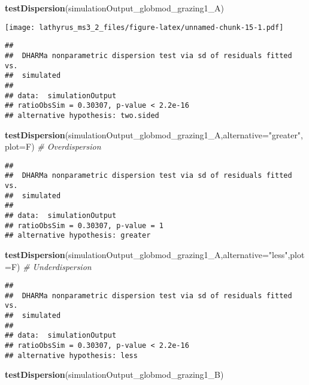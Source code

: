 \documentclass[
]{article}
\newenvironment{Shaded}{\begin{snugshade}}{\end{snugshade}}
\newcommand{\CommentTok}[1]{\textcolor[rgb]{0.56,0.35,0.01}{\textit{#1}}}
\newcommand{\DataTypeTok}[1]{\textcolor[rgb]{0.13,0.29,0.53}{#1}}
\newcommand{\KeywordTok}[1]{\textcolor[rgb]{0.13,0.29,0.53}{\textbf{#1}}}
\newcommand{\NormalTok}[1]{#1}
\newcommand{\StringTok}[1]{\textcolor[rgb]{0.31,0.60,0.02}{#1}}
\begin{document}
\begin{Shaded}
\begin{Highlighting}[]
\KeywordTok{testDispersion}\NormalTok{(simulationOutput_globmod_grazing1_A)}
\end{Highlighting}
\end{Shaded}

\texttt{[image: lathyrus\_ms3\_2\_files/figure-latex/unnamed-chunk-15-1.pdf]}

\begin{verbatim}
## 
##  DHARMa nonparametric dispersion test via sd of residuals fitted vs.
##  simulated
## 
## data:  simulationOutput
## ratioObsSim = 0.30307, p-value < 2.2e-16
## alternative hypothesis: two.sided
\end{verbatim}

\begin{Shaded}
\begin{Highlighting}[]
\KeywordTok{testDispersion}\NormalTok{(simulationOutput_globmod_grazing1_A,}\DataTypeTok{alternative=}\StringTok{"greater"}\NormalTok{,}\DataTypeTok{plot=}\NormalTok{F) }\CommentTok{# Overdispersion}
\end{Highlighting}
\end{Shaded}

\begin{verbatim}
## 
##  DHARMa nonparametric dispersion test via sd of residuals fitted vs.
##  simulated
## 
## data:  simulationOutput
## ratioObsSim = 0.30307, p-value = 1
## alternative hypothesis: greater
\end{verbatim}

\begin{Shaded}
\begin{Highlighting}[]
\KeywordTok{testDispersion}\NormalTok{(simulationOutput_globmod_grazing1_A,}\DataTypeTok{alternative=}\StringTok{"less"}\NormalTok{,}\DataTypeTok{plot=}\NormalTok{F) }\CommentTok{# Underdispersion}
\end{Highlighting}
\end{Shaded}

\begin{verbatim}
## 
##  DHARMa nonparametric dispersion test via sd of residuals fitted vs.
##  simulated
## 
## data:  simulationOutput
## ratioObsSim = 0.30307, p-value < 2.2e-16
## alternative hypothesis: less
\end{verbatim}

\begin{Shaded}
\begin{Highlighting}[]
\KeywordTok{testDispersion}\NormalTok{(simulationOutput_globmod_grazing1_B)}
\end{Highlighting}
\end{Shaded}
\end{document}
